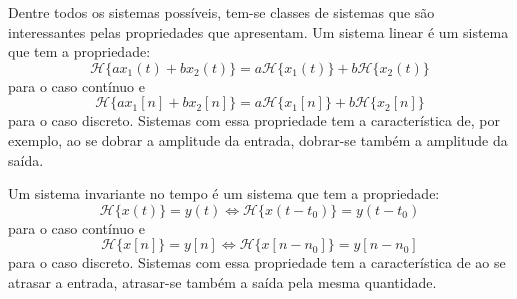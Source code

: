 \documentclass[12pt,a4paper]{report}
\begin{document}
  Dentre todos os sistemas possíveis, tem-se classes de sistemas que são interessantes pelas propriedades que
  apresentam. Um sistema linear é um sistema que tem a propriedade:
  \begin{equation}
    \mathcal{H}\{a x_1(t) + b x_2(t)\} = a \mathcal{H}\{x_1(t)\} + b \mathcal{H}\{x_2(t)\}
  \end{equation}
  para o caso contínuo e
  \begin{equation}
    \mathcal{H}\{a x_1[n] + b x_2[n]\} = a \mathcal{H}\{x_1[n]\} + b \mathcal{H}\{x_2[n]\}
  \end{equation}
  para o caso discreto. Sistemas com essa propriedade tem a característica de, por exemplo, ao se dobrar a
  amplitude da entrada, dobrar-se também a amplitude da saída.

  Um sistema invariante no tempo é um sistema que tem a propriedade:
  \begin{equation}
    \mathcal{H}\{x(t)\} = y(t) \Leftrightarrow \mathcal{H}\{x(t - t_0)\} = y(t - t_0)
  \end{equation}
  para o caso contínuo e
  \begin{equation}
    \mathcal{H}\{x[n]\} = y[n] \Leftrightarrow \mathcal{H}\{x[n - n_0]\} = y[n - n_0]
  \end{equation}
  para o caso discreto. Sistemas com essa propriedade tem a característica de ao se atrasar a entrada, atrasar-se
  também a saída pela mesma quantidade.
\end{document}
